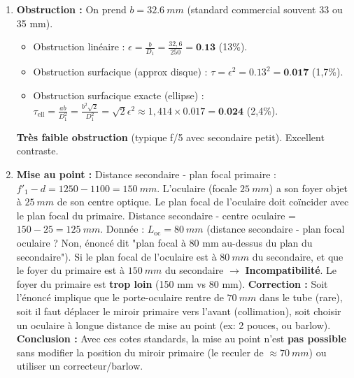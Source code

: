 \documentclass[11pt]{article}
\begin{document}
\begin{exoresolu}
\begin{enumerate}
\[    \]
    Le rayon du cône axial au secondaire est $\SI{15}{mm}$. Le rayon total nécessaire pour capter le bord de champ est la somme (cône axial décentré) :
    \[
    r_{\text{total}} = r_{\text{axe}} + y_{\text{champ}} = 15 + 1,32 = \SI{16,32}{mm}.
    \]
    Diamètre mineur requis : $b_{\text{champ}} = 2 r_{\text{total}} = \mathbf{\SI{32,6}{mm}}$.
    (Axe majeur $a = b\sqrt{2} \approx \SI{46,1}{mm}$).
    \item \textbf{Obstruction :} On prend $b = \SI{32,6}{mm}$ (standard commercial souvent 33 ou 35 mm).
    \begin{itemize}
        \item Obstruction linéaire : $\epsilon = \frac{b}{D_1} = \frac{32,6}{250} = \mathbf{\num{0,13}}$ (13\%).
        \item Obstruction surfacique (approx disque) : $\tau = \epsilon^2 = \num{0,13}^2 = \mathbf{\num{0,017}}$ (1,7\%).
        \item Obstruction surfacique exacte (ellipse) : $\tau_{\text{ell}} = \frac{ab}{D_1^2} = \frac{b^2\sqrt{2}}{D_1^2} = \sqrt{2} \epsilon^2 \approx 1,414 \times \num{0,017} = \mathbf{\num{0,024}}$ (2,4\%).
    \end{itemize}
    \textbf{Très faible obstruction} (typique f/5 avec secondaire petit). Excellent contraste.
    \item \textbf{Mise au point :}
    Distance secondaire - plan focal primaire : $f'_1 - d = 1250 - 1100 = \SI{150}{mm}$.
    L'oculaire (focale $\SI{25}{mm}$) a son foyer objet à $\SI{25}{mm}$ de son centre optique.
    Le plan focal de l'oculaire doit coïncider avec le plan focal du primaire.
    Distance secondaire - centre oculaire = $150 - 25 = \SI{125}{mm}$.
    Donnée : $L_{\text{oc}} = \SI{80}{mm}$ (distance secondaire - plan focal oculaire ? Non, énoncé dit "plan focal à 80 mm au-dessus du plan du secondaire").
    Si le plan focal de l'oculaire est à $\SI{80}{mm}$ du secondaire, et que le foyer du primaire est à $\SI{150}{mm}$ du secondaire $\rightarrow$ \textbf{Incompatibilité}. Le foyer du primaire est \textbf{trop loin} (150 mm vs 80 mm).
    \textbf{Correction :} Soit l'énoncé implique que le porte-oculaire rentre de $\SI{70}{mm}$ dans le tube (rare), soit il faut déplacer le miroir primaire vers l'avant (collimation), soit choisir un oculaire à longue distance de mise au point (ex: 2 pouces, ou barlow).
    \textbf{Conclusion :} Avec ces cotes standards, la mise au point n'est \textbf{pas possible} sans modifier la position du miroir primaire (le reculer de $\approx \SI{70}{mm}$) ou utiliser un correcteur/barlow.
\end{enumerate}
\end{exoresolu}
\end{document}
